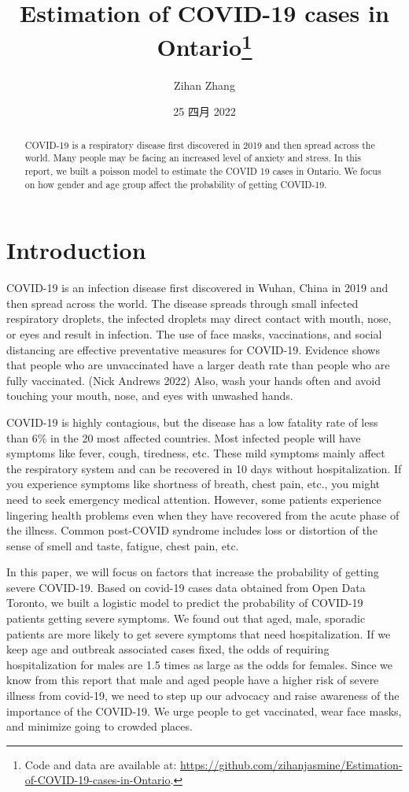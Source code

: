 \documentclass[
]{article}
\title{Estimation of COVID-19 cases in Ontario\thanks{Code and data are available at: \url{https://github.com/zihanjasmine/Estimation-of-COVID-19-cases-in-Ontario}.}}
\author{Zihan Zhang}
\date{25 四月 2022}
\begin{document}
\maketitle
\begin{abstract}
COVID-19 is a respiratory disease first discovered in 2019 and then spread across the world. Many people may be facing an increased level of anxiety and stress. In this report, we built a poisson model to estimate the COVID 19 cases in Ontario. We focus on how gender and age group affect the probability of getting COVID-19.
\end{abstract}

{
\setcounter{tocdepth}{2}
\tableofcontents
}
\newpage

\hypertarget{introduction}{%
\section{Introduction}\label{introduction}}

COVID-19 is an infection disease first discovered in Wuhan, China in 2019 and then spread across the world. The disease spreads through small infected respiratory droplets, the infected droplets may direct contact with mouth, nose, or eyes and result in infection. The use of face masks, vaccinations, and social distancing are effective preventative measures for COVID-19. Evidence shows that people who are unvaccinated have a larger death rate than people who are fully vaccinated. (Nick Andrews 2022) Also, wash your hands often and avoid touching your mouth, nose, and eyes with unwashed hands.

COVID-19 is highly contagious, but the disease has a low fatality rate of less than 6\% in the 20 most affected countries. Most infected people will have symptoms like fever, cough, tiredness, etc. These mild symptoms mainly affect the respiratory system and can be recovered in 10 days without hospitalization. If you experience symptoms like shortness of breath, chest pain, etc., you might need to seek emergency medical attention. However, some patients experience lingering health problems even when they have recovered from the acute phase of the illness. Common post-COVID syndrome includes loss or distortion of the sense of smell and taste, fatigue, chest pain, etc.

In this paper, we will focus on factors that increase the probability of getting severe COVID-19. Based on covid-19 cases data obtained from Open Data Toronto, we built a logistic model to predict the probability of COVID-19 patients getting severe symptoms. We found out that aged, male, sporadic patients are more likely to get severe symptoms that need hospitalization. If we keep age and outbreak associated cases fixed, the odds of requiring hospitalization for males are 1.5 times as large as the odds for females. Since we know from this report that male and aged people have a higher risk of severe illness from covid-19, we need to step up our advocacy and raise awareness of the importance of the COVID-19. We urge people to get vaccinated, wear face masks, and minimize going to crowded places.
\end{document}
